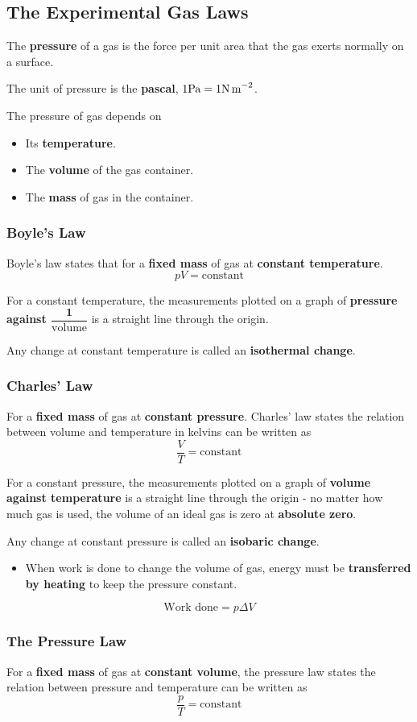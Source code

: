 \subsection{The Experimental Gas Laws}

The \textbf{pressure} of a gas is the force per unit area that the gas exerts normally on a surface.

The unit of pressure is the \textbf{pascal}, $1\text{Pa}=1\text{N\,m}^{-2}$.

The pressure of gas depends on
\begin{itemize}
    \item Its \textbf{temperature}.
    \item The \textbf{volume} of the gas container.
    \item The \textbf{mass} of gas in the container.
\end{itemize}

\subsubsection*{Boyle's Law}

Boyle's law states that for a \textbf{fixed mass} of gas at \textbf{constant temperature}.
$$pV=\text{constant}$$

For a constant temperature, the measurements plotted on a graph of \textbf{pressure against $\dfrac{\mathbf{1}}{\text{volume}}$} is a straight line through the origin.

Any change at constant temperature is called an \textbf{isothermal change}.

\subsubsection*{Charles' Law}

For a \textbf{fixed mass} of gas at \textbf{constant pressure}. Charles' law states the relation between volume and temperature in kelvins can be written as
$$\frac{V}{T}=\text{constant}$$

For a constant pressure, the measurements plotted on a graph of \textbf{volume against temperature} is a straight line through the origin - no matter how much gas is used, the volume of an ideal gas is zero at \textbf{absolute zero}.

Any change at constant pressure is called an \textbf{isobaric change}.
\begin{itemize}
    \item When work is done to change the volume of gas, energy must be \textbf{transferred by heating} to keep the pressure constant.
\end{itemize}
$$\text{Work done}=p\Delta V$$

\subsubsection*{The Pressure Law}

For a \textbf{fixed mass} of gas at \textbf{constant volume}, the pressure law states the relation between pressure and temperature can be written as
$$\frac{p}{T}=\text{constant}$$
